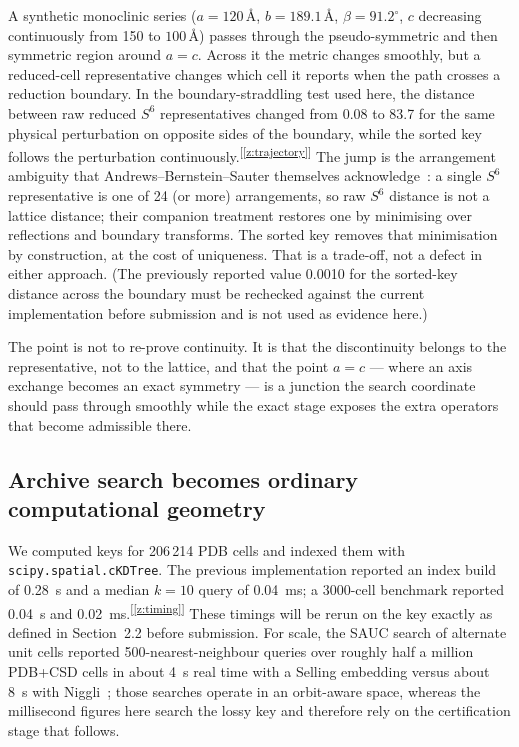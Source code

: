 \documentclass[11pt]{article}
\newcommand{\Ang}{\text{\AA}}
\newcommand{\chk}[1]{\textsuperscript{[\ref{#1}]}}
\begin{document}
A synthetic monoclinic series ($a=120\,\Ang$, $b=189.1\,\Ang$, $\beta=91.2^\circ$, $c$ decreasing continuously from 150 to $100\,\Ang$) passes through the pseudo-symmetric and then symmetric region around $a=c$. Across it the metric changes smoothly, but a reduced-cell representative changes which cell it reports when the path crosses a reduction boundary. In the boundary-straddling test used here, the distance between raw reduced $S^6$ representatives changed from 0.08 to 83.7 for the same physical perturbation on opposite sides of the boundary, while the sorted key follows the perturbation continuously.\chk{z:trajectory} The jump is the arrangement ambiguity that Andrews--Bernstein--Sauter themselves acknowledge~\cite{abs2019}: a single $S^6$ representative is one of 24 (or more) arrangements, so raw $S^6$ distance is not a lattice distance; their companion treatment restores one by minimising over reflections and boundary transforms. The sorted key removes that minimisation by construction, at the cost of uniqueness. That is a trade-off, not a defect in either approach. (The previously reported value 0.0010 for the sorted-key distance across the boundary must be rechecked against the current implementation before submission and is not used as evidence here.)

The point is not to re-prove continuity. It is that the discontinuity belongs to the representative, not to the lattice, and that the point $a=c$ --- where an axis exchange becomes an exact symmetry --- is a junction the search coordinate should pass through smoothly while the exact stage exposes the extra operators that become admissible there.


\subsection{Archive search becomes ordinary computational geometry}

We computed keys for 206\,214 PDB cells and indexed them with \texttt{scipy.spatial.cKDTree}. The previous implementation reported an index build of \SI{0.28}{\second} and a median $k=10$ query of \SI{0.04}{\milli\second}; a 3000-cell benchmark reported \SI{0.04}{\second} and \SI{0.02}{\milli\second}.\chk{z:timing} These timings will be rerun on the key exactly as defined in Section~2.2 before submission. For scale, the SAUC search of alternate unit cells reported 500-nearest-neighbour queries over roughly half a million PDB+CSD cells in about \SI{4}{\second} real time with a Selling embedding versus about \SI{8}{\second} with Niggli~\cite{mcgill2014}; those searches operate in an orbit-aware space, whereas the millisecond figures here search the lossy key and therefore rely on the certification stage that follows.
\end{document}
